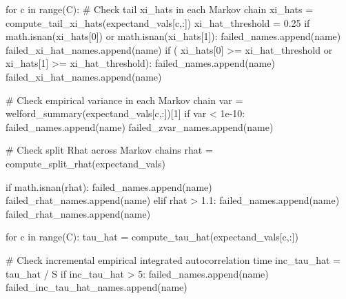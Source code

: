 \documentclass[
  letterpaper,
  DIV=11,
  numbers=noendperiod]{scrartcl}
\newenvironment{Shaded}{\begin{snugshade}}{\end{snugshade}}
\newcommand{\BuiltInTok}[1]{\textcolor[rgb]{0.00,0.23,0.31}{#1}}
\newcommand{\CommentTok}[1]{\textcolor[rgb]{0.37,0.37,0.37}{#1}}
\newcommand{\ControlFlowTok}[1]{\textcolor[rgb]{0.00,0.23,0.31}{#1}}
\newcommand{\DecValTok}[1]{\textcolor[rgb]{0.68,0.00,0.00}{#1}}
\newcommand{\FloatTok}[1]{\textcolor[rgb]{0.68,0.00,0.00}{#1}}
\newcommand{\KeywordTok}[1]{\textcolor[rgb]{0.00,0.23,0.31}{#1}}
\newcommand{\NormalTok}[1]{\textcolor[rgb]{0.00,0.23,0.31}{#1}}
\newcommand{\OperatorTok}[1]{\textcolor[rgb]{0.37,0.37,0.37}{#1}}
\begin{document}
\begin{Shaded}
\begin{Highlighting}[]
    \ControlFlowTok{for}\NormalTok{ c }\KeywordTok{in} \BuiltInTok{range}\NormalTok{(C):}
      \CommentTok{\# Check tail xi\_hats in each Markov chain}
\NormalTok{      xi\_hats }\OperatorTok{=}\NormalTok{ compute\_tail\_xi\_hats(expectand\_vals[c,:])}
\NormalTok{      xi\_hat\_threshold }\OperatorTok{=} \FloatTok{0.25}
      \ControlFlowTok{if}\NormalTok{ math.isnan(xi\_hats[}\DecValTok{0}\NormalTok{]) }\KeywordTok{or}\NormalTok{ math.isnan(xi\_hats[}\DecValTok{1}\NormalTok{]):}
\NormalTok{        failed\_names.append(name)}
\NormalTok{        failed\_xi\_hat\_names.append(name)}
      \ControlFlowTok{if}\NormalTok{ (   xi\_hats[}\DecValTok{0}\NormalTok{] }\OperatorTok{\textgreater{}=}\NormalTok{ xi\_hat\_threshold}
          \KeywordTok{or}\NormalTok{ xi\_hats[}\DecValTok{1}\NormalTok{] }\OperatorTok{\textgreater{}=}\NormalTok{ xi\_hat\_threshold):}
\NormalTok{        failed\_names.append(name)}
\NormalTok{        failed\_xi\_hat\_names.append(name)}
    
      \CommentTok{\# Check empirical variance in each Markov chain}
\NormalTok{      var }\OperatorTok{=}\NormalTok{ welford\_summary(expectand\_vals[c,:])[}\DecValTok{1}\NormalTok{]}
      \ControlFlowTok{if}\NormalTok{ var }\OperatorTok{\textless{}} \FloatTok{1e{-}10}\NormalTok{:}
\NormalTok{        failed\_names.append(name)}
\NormalTok{        failed\_zvar\_names.append(name)}
    
    \CommentTok{\# Check split Rhat across Markov chains}
\NormalTok{    rhat }\OperatorTok{=}\NormalTok{ compute\_split\_rhat(expectand\_vals)}
    
    \ControlFlowTok{if}\NormalTok{ math.isnan(rhat):}
\NormalTok{      failed\_names.append(name)}
\NormalTok{      failed\_rhat\_names.append(name)}
    \ControlFlowTok{elif}\NormalTok{ rhat }\OperatorTok{\textgreater{}} \FloatTok{1.1}\NormalTok{:}
\NormalTok{      failed\_names.append(name)}
\NormalTok{      failed\_rhat\_names.append(name)}
    
    \ControlFlowTok{for}\NormalTok{ c }\KeywordTok{in} \BuiltInTok{range}\NormalTok{(C):}
\NormalTok{      tau\_hat }\OperatorTok{=}\NormalTok{ compute\_tau\_hat(expectand\_vals[c,:])}

      \CommentTok{\# Check incremental empirical integrated autocorrelation time}
\NormalTok{      inc\_tau\_hat }\OperatorTok{=}\NormalTok{ tau\_hat }\OperatorTok{/}\NormalTok{ S}
      \ControlFlowTok{if}\NormalTok{ inc\_tau\_hat }\OperatorTok{\textgreater{}} \DecValTok{5}\NormalTok{:}
\NormalTok{        failed\_names.append(name)}
\NormalTok{        failed\_inc\_tau\_hat\_names.append(name)}


\end{Highlighting}
\end{Shaded}
\end{document}
